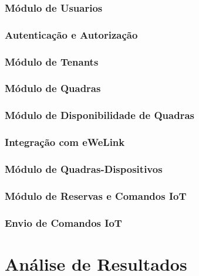 \subsubsection{Módulo de Usuarios}\label{subsubsec:modulo_usuarios}

\subsubsection{Autenticação e Autorização}\label{subsubsec:autenticacao_autorizacao}

\subsubsection{Módulo de Tenants}\label{subsubsec:modulo_tenants}

\subsubsection{Módulo de Quadras}\label{subsubsec:modulo_quadras}

\subsubsection{Módulo de Disponibilidade de Quadras}\label{subsubsec:modulo_disponibilidade_quadras}

\subsubsection{Integração com eWeLink}\label{subsubsec:integacao_ewelink}

\subsubsection{Módulo de Quadras-Dispositivos}\label{subsubsec:modulo_quadras_dispositivos}

\subsubsection{Módulo de Reservas e Comandos IoT}\label{subsubsec:modulo_reservas}

\subsubsection{Envio de Comandos IoT}\label{subsubsec:envio_comandos_iot}

\section{Análise de Resultados}\label{sec:analise_resultados}

